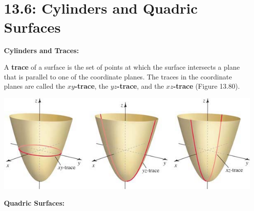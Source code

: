 \documentclass[mathNotesPreamble]{subfiles}
\begin{document}
\section{13.6: Cylinders and Quadric Surfaces}
  \textbf{Cylinders and Traces:}\\
  
  
  \begin{defn*}[Trace]
    A \textbf{trace} of a surface is the set of points at which the surface intersects a plane that is parallel to one of the coordinate planes. The traces in the coordinate planes are called the \textbf{$xy$-trace}, the \textbf{$yz$-trace}, and the \textbf{$xz$-trace} (Figure 13.80).
  \end{defn*}
  \begin{center}
    \includegraphics[width=0.75\linewidth]{images/briggs_13_06/fig13_80}
  \end{center}
  \pagebreak
  
  \textbf{Quadric Surfaces:}
  
\end{document}
